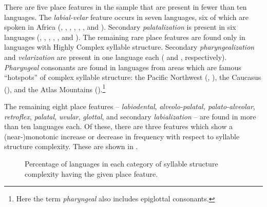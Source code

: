   There are five place features in the sample that are present in fewer than ten languages. The \textit{labial-velar} feature occurs in seven languages, six of which are spoken in Africa (, , , , , , and ). Secondary \textit{palatalization} is present in six languages (, , , , , and ). The remaining rare place features are found only in languages with Highly Complex syllable structure. Secondary \textit{pharyngealization} and \textit{velarization} are present in one language each ( and , respectively). \textit{Pharyngeal} consonants are found in languages from areas which are famous ``hotspots'' of complex syllable structure: the Pacific Northwest (, ), the Caucasus (), and the Atlas Mountains ().\footnote{{Here the term} \textrm{\textit{pharyngeal} }\textrm{also includes epiglottal consonants.}}

  The remaining eight place features -- \textit{labiodental}, \textit{alveolo-palatal, palato-alveolar}, \textit{retroflex}, \textit{palatal}, \textit{uvular}, \textit{glottal}, and secondary \textit{labialization} -- are found in more than ten languages each. Of these, there are three features which show a \mbox{(near-)}\linebreak monotonic increase or decrease in frequency with respect to syllable structure complexity. These are shown in .

\begin{figure}
\caption{\label{fig:4.8} Percentage of languages in each category of syllable structure complexity having the given place feature.}
\end{figure}


